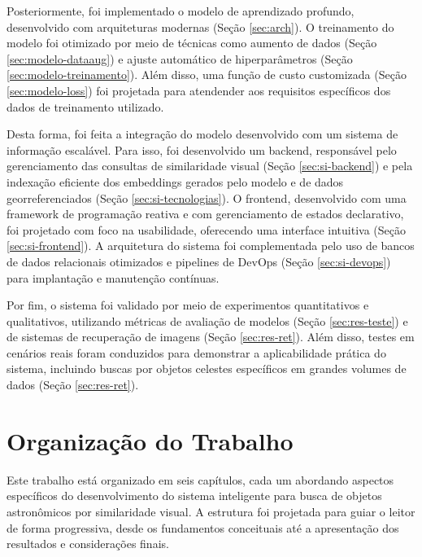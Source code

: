 Posteriormente, foi implementado o modelo de aprendizado profundo, desenvolvido com arquiteturas modernas (Seção \ref{sec:arch}). O treinamento do modelo foi otimizado por meio de técnicas como aumento de dados (Seção \ref{sec:modelo-dataaug}) e ajuste automático de hiperparâmetros (Seção \ref{sec:modelo-treinamento}). Além disso, uma função de custo customizada (Seção \ref{sec:modelo-loss}) foi projetada para atendender aos requisitos específicos dos dados de treinamento utilizado.

Desta forma, foi feita a integração do modelo desenvolvido com um sistema de informação escalável. Para isso, foi desenvolvido um backend, responsável pelo gerenciamento das consultas de similaridade visual (Seção \ref{sec:si-backend}) e pela indexação eficiente dos embeddings gerados pelo modelo e de dados georreferenciados (Seção \ref{sec:si-tecnologias}). O frontend, desenvolvido com uma framework de programação reativa e com gerenciamento de estados declarativo, foi projetado com foco na usabilidade, oferecendo uma interface intuitiva (Seção \ref{sec:si-frontend}). A arquitetura do sistema foi complementada pelo uso de bancos de dados relacionais otimizados e pipelines de DevOps (Seção \ref{sec:si-devops}) para implantação e manutenção contínuas.

Por fim, o sistema foi validado por meio de experimentos quantitativos e qualitativos, utilizando métricas de avaliação de modelos (Seção \ref{sec:res-teste}) e de sistemas de recuperação de imagens (Seção \ref{sec:res-ret}). Além disso, testes em cenários reais foram conduzidos para demonstrar a aplicabilidade prática do sistema, incluindo buscas por objetos celestes específicos em grandes volumes de dados (Seção \ref{sec:res-ret}).




\section{Organização do Trabalho}
\label{sec:organizacao}
Este trabalho está organizado em seis capítulos, cada um abordando aspectos específicos do desenvolvimento do sistema inteligente para busca de objetos astronômicos por similaridade visual. A estrutura foi projetada para guiar o leitor de forma progressiva, desde os fundamentos conceituais até a apresentação dos resultados e considerações finais.

